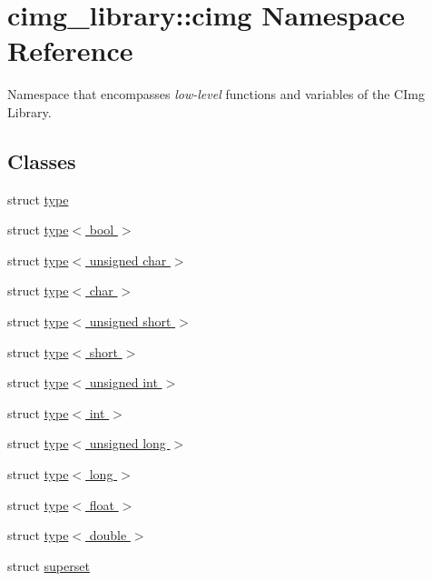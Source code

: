 \hypertarget{namespacecimg__library_1_1cimg}{\section{cimg\-\_\-library\-:\-:cimg Namespace Reference}
\label{namespacecimg__library_1_1cimg}
}


Namespace that encompasses {\itshape low-\/level} functions and variables of the C\-Img Library.  


\subsection*{Classes}
\begin{DoxyCompactItemize}
\item 
struct \hyperlink{structcimg__library_1_1cimg_1_1type}{type}
\item 
struct \hyperlink{structcimg__library_1_1cimg_1_1type_3_01bool_01_4}{type$<$ bool $>$}
\item 
struct \hyperlink{structcimg__library_1_1cimg_1_1type_3_01unsigned_01char_01_4}{type$<$ unsigned char $>$}
\item 
struct \hyperlink{structcimg__library_1_1cimg_1_1type_3_01char_01_4}{type$<$ char $>$}
\item 
struct \hyperlink{structcimg__library_1_1cimg_1_1type_3_01unsigned_01short_01_4}{type$<$ unsigned short $>$}
\item 
struct \hyperlink{structcimg__library_1_1cimg_1_1type_3_01short_01_4}{type$<$ short $>$}
\item 
struct \hyperlink{structcimg__library_1_1cimg_1_1type_3_01unsigned_01int_01_4}{type$<$ unsigned int $>$}
\item 
struct \hyperlink{structcimg__library_1_1cimg_1_1type_3_01int_01_4}{type$<$ int $>$}
\item 
struct \hyperlink{structcimg__library_1_1cimg_1_1type_3_01unsigned_01long_01_4}{type$<$ unsigned long $>$}
\item 
struct \hyperlink{structcimg__library_1_1cimg_1_1type_3_01long_01_4}{type$<$ long $>$}
\item 
struct \hyperlink{structcimg__library_1_1cimg_1_1type_3_01float_01_4}{type$<$ float $>$}
\item 
struct \hyperlink{structcimg__library_1_1cimg_1_1type_3_01double_01_4}{type$<$ double $>$}
\item 
struct \hyperlink{structcimg__library_1_1cimg_1_1superset}{superset}
\item 

\end{DoxyCompactItemize}
